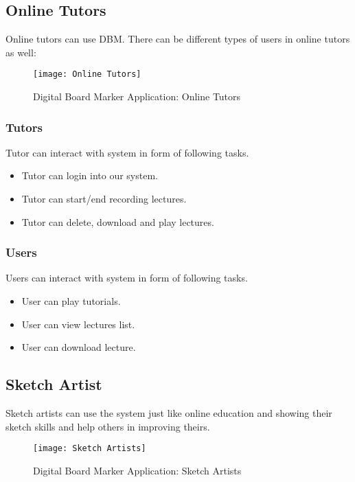 \subsection{Online Tutors}
Online tutors can use DBM. There can be different types of users in online tutors as well:

\bigskip

\begin{figure}[h]
  \centering
  \texttt{[image: Online Tutors]}
  \caption{Digital Board Marker Application: Online Tutors}
\end{figure}

\bigskip

\subsubsection{Tutors}

Tutor can interact with system in form of following tasks.
\begin{itemize}
\item Tutor can login into our system.
\item Tutor can start/end recording lectures.
\item Tutor can delete, download and play lectures.
\end{itemize}

\bigskip

\subsubsection{Users}

Users can interact with system in form of following tasks.
\begin{itemize}
\item User can play tutorials.
\item User can view lectures list.
\item User can download lecture.
\end{itemize}
\bigskip


\subsection{Sketch Artist}
Sketch artists can use the system just like online education and showing their sketch skills and help others in improving theirs.

\bigskip

\begin{figure}[h]
  \centering
  \texttt{[image: Sketch Artists]}
  \caption{Digital Board Marker Application: Sketch Artists}
\end{figure}

